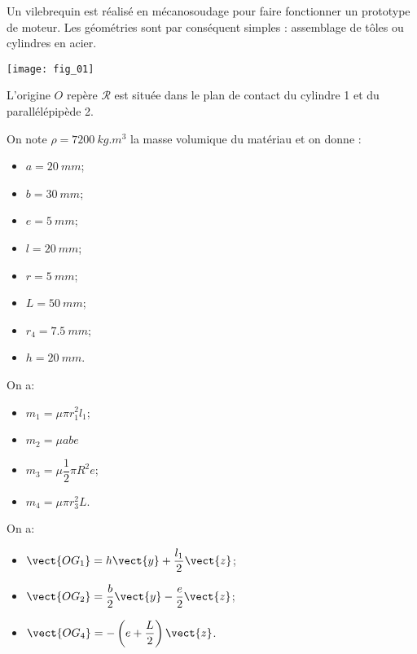 \ifprof
\else
\begin{multicols}{2}
\fi


\ifprof
\else
Un vilebrequin est réalisé en mécanosoudage pour faire fonctionner un prototype de moteur. Les géométries sont par conséquent simples : assemblage de tôles ou cylindres en acier.

\begin{center}
\texttt{[image: fig\_01]}
\end{center}
L'origine $O$ repère $\mathcal{R}$ est située dans le plan de contact du cylindre 1 et du parallélépipède 2.

On note $\rho=\SI{7200}{kg.m^{3}}$ la masse volumique du matériau et on donne :
\begin{multicols}{2}
\begin{itemize}
\item $a = \SI{20}{mm}$;
\item $b = \SI{30}{mm}$;
\item $e = \SI{5}{mm}$;
\item $l = \SI{20}{mm}$;
\item $r = \SI{5}{mm}$;
\item $L = \SI{50}{mm}$;
\item $r_4 = \SI{7.5}{mm}$;
\item $h = \SI{20}{mm}$.
\end{itemize}
\end{multicols}
\fi


\ifprof \begin{corrige}
On a: 
\begin{itemize}
\item $m_1 = \mu \pi r_1^2 l_1$;
\item $m_2 = \mu a b e$
\item $m_3 = \mu \dfrac{1}{2}\pi R^2 e$;
\item $m_4 = \mu \pi r_3^2L$.
\end{itemize}
\end{corrige}
\else
\fi


\ifprof \begin{corrige}
On a: 
\begin{itemize}
\item $\vect{OG_1} = h\vect{y}+\dfrac{l_1}{2}\vect{z}$;
\item $\vect{OG_2} = \dfrac{b}{2}\vect{y}-\dfrac{e}{2}\vect{z}$;
\item $\vect{OG_4} = -\left(e+\dfrac{L}{2}\right)\vect{z}$.
\end{itemize}


\end{corrige}
\end{multicols}
